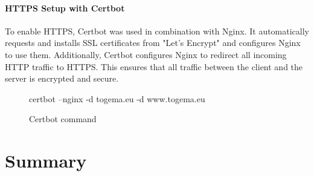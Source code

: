 \documentclass[a4paper,12pt]{report}
\begin{document}
\subsubsection{HTTPS Setup with Certbot}
To enable HTTPS, Certbot was used in combination with Nginx. It automatically requests and installs SSL certificates from "Let’s Encrypt" and configures Nginx to use them. Additionally, Certbot configures Nginx to redirect all incoming HTTP traffic to HTTPS. This ensures that all traffic between the client and the server is encrypted and secure.
\begin{figure}[H]
	\begin{terminal}
		certbot --nginx -d togema.eu -d www.togema.eu
	\end{terminal}
	\caption{Certbot command}
\end{figure}

\chapter{Summary}

\cleardoublepage
{}
\printbibliography

\cleardoublepage
{}
\listoffigures
\end{document}
